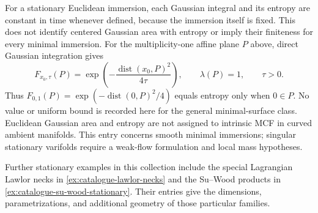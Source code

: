 \begin{example}
For a stationary Euclidean immersion, each Gaussian integral and its entropy are constant in time whenever defined, because the immersion itself is fixed. This does not identify centered Gaussian area with entropy or imply their finiteness for every minimal immersion. For the multiplicity-one affine plane $P$ above, direct Gaussian integration gives
\[
 F_{x_0,\tau}(P)=\exp\left(-\frac{\operatorname{dist}(x_0,P)^2}{4\tau}\right),
 \qquad \lambda(P)=1,\qquad \tau>0.
\]
Thus $F_{0,1}(P)=\exp(-\operatorname{dist}(0,P)^2/4)$ equals entropy only when $0\in P$. No value or uniform bound is recorded here for the general minimal-surface class. Euclidean Gaussian area and entropy are not assigned to intrinsic MCF in curved ambient manifolds. This entry concerns smooth minimal immersions; singular stationary varifolds require a weak-flow formulation and local mass hypotheses.

Further stationary examples in this collection include the special Lagrangian Lawlor necks in \ref{ex:catalogue-lawlor-necks} and the Su--Wood products in \ref{ex:catalogue-su-wood-stationary}. Their entries give the dimensions, parametrizations, and additional geometry of those particular families.
\end{example}

